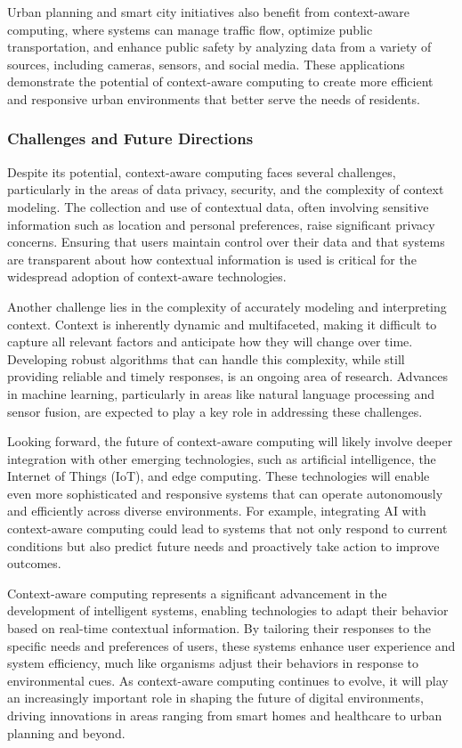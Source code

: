 \documentclass[12pt,twoside]{article}
\begin{document}
Urban planning and smart city initiatives also benefit from context-aware computing, where systems can manage traffic flow, optimize public transportation, and enhance public safety by analyzing data from a variety of sources, including cameras, sensors, and social media. These applications demonstrate the potential of context-aware computing to create more efficient and responsive urban environments that better serve the needs of residents.

\subsubsection{Challenges and Future Directions}

Despite its potential, context-aware computing faces several challenges, particularly in the areas of data privacy, security, and the complexity of context modeling. The collection and use of contextual data, often involving sensitive information such as location and personal preferences, raise significant privacy concerns. Ensuring that users maintain control over their data and that systems are transparent about how contextual information is used is critical for the widespread adoption of context-aware technologies.

Another challenge lies in the complexity of accurately modeling and interpreting context. Context is inherently dynamic and multifaceted, making it difficult to capture all relevant factors and anticipate how they will change over time. Developing robust algorithms that can handle this complexity, while still providing reliable and timely responses, is an ongoing area of research. Advances in machine learning, particularly in areas like natural language processing and sensor fusion, are expected to play a key role in addressing these challenges.

Looking forward, the future of context-aware computing will likely involve deeper integration with other emerging technologies, such as artificial intelligence, the Internet of Things (IoT), and edge computing. These technologies will enable even more sophisticated and responsive systems that can operate autonomously and efficiently across diverse environments. For example, integrating AI with context-aware computing could lead to systems that not only respond to current conditions but also predict future needs and proactively take action to improve outcomes.

Context-aware computing represents a significant advancement in the development of intelligent systems, enabling technologies to adapt their behavior based on real-time contextual information. By tailoring their responses to the specific needs and preferences of users, these systems enhance user experience and system efficiency, much like organisms adjust their behaviors in response to environmental cues. As context-aware computing continues to evolve, it will play an increasingly important role in shaping the future of digital environments, driving innovations in areas ranging from smart homes and healthcare to urban planning and beyond.
\end{document}
